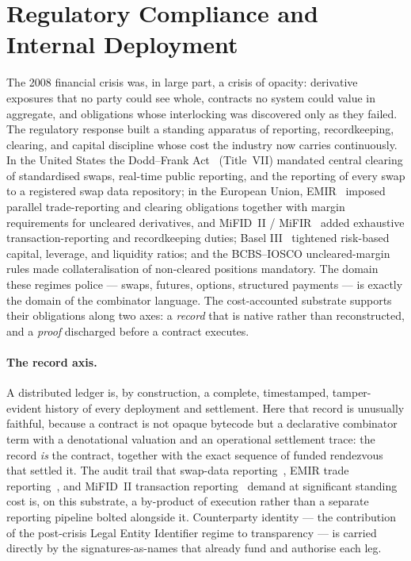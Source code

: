 \documentclass[11pt]{article}
\theoremstyle{definition}
\theoremstyle{plain}
\begin{document}
\section{Regulatory Compliance and Internal Deployment}\label{sec:compliance}

The 2008 financial crisis was, in large part, a crisis of opacity: derivative exposures that no party
could see whole, contracts no system could value in aggregate, and obligations whose interlocking was
discovered only as they failed. The regulatory response built a standing apparatus of reporting,
recordkeeping, clearing, and capital discipline whose cost the industry now carries continuously. In
the United States the Dodd--Frank Act~\cite{DoddFrank2010} (Title~VII) mandated central clearing of
standardised swaps, real-time public reporting, and the reporting of every swap to a registered swap
data repository; in the European Union, EMIR~\cite{EMIR2012} imposed parallel trade-reporting and
clearing obligations together with margin requirements for uncleared derivatives, and MiFID~II /
MiFIR~\cite{MiFIDII2014} added exhaustive transaction-reporting and recordkeeping duties; Basel
III~\cite{BaselIII2011} tightened risk-based capital, leverage, and liquidity ratios; and the
BCBS--IOSCO uncleared-margin rules made collateralisation of non-cleared positions mandatory. The
domain these regimes police --- swaps, futures, options, structured payments --- is exactly the domain
of the combinator language. The cost-accounted substrate supports their obligations along two axes: a
\emph{record} that is native rather than reconstructed, and a \emph{proof} discharged before a contract
executes.

\paragraph{The record axis.} A distributed ledger is, by construction, a complete, timestamped,
tamper-evident history of every deployment and settlement. Here that record is unusually faithful,
because a contract is not opaque bytecode but a declarative combinator term with a denotational
valuation and an operational settlement trace: the record \emph{is} the contract, together with the
exact sequence of funded rendezvous that settled it. The audit trail that swap-data
reporting~\cite{DoddFrank2010}, EMIR trade reporting~\cite{EMIR2012}, and MiFID~II transaction
reporting~\cite{MiFIDII2014} demand at significant standing cost is, on this substrate, a by-product of
execution rather than a separate reporting pipeline bolted alongside it. Counterparty identity ---
the contribution of the post-crisis Legal Entity Identifier regime to transparency --- is carried
directly by the signatures-as-names that already fund and authorise each leg.
\end{document}
